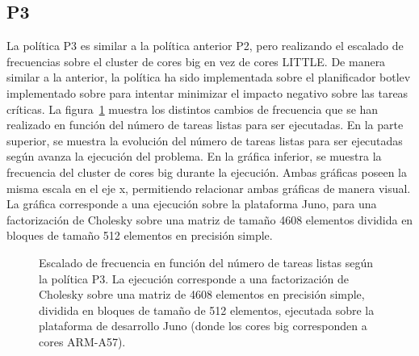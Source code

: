 \subsection{P3}
La política P3 es similar a la política anterior P2, pero realizando el
escalado de frecuencias sobre el cluster de cores big en vez de cores
LITTLE. De manera similar a la anterior, la política ha sido implementada
sobre el planificador botlev implementado sobre \ompss para intentar
minimizar el impacto negativo sobre las tareas críticas. La
figura~\ref{s5:fig:P3-evo} muestra los distintos cambios de frecuencia que
se han realizado en función del número de tareas listas para ser
ejecutadas. En la parte superior, se muestra la evolución del número de
tareas listas para ser ejecutadas según avanza la ejecución del
problema. En la gráfica inferior, se muestra la frecuencia del cluster de
cores big durante la ejecución. Ambas gráficas poseen la misma escala en el
eje x, permitiendo relacionar ambas gráficas de manera visual. La gráfica
corresponde a una ejecución sobre la plataforma Juno, para una
factorización de Cholesky sobre una matriz de tamaño 4608 elementos
dividida en bloques de tamaño 512 elementos en precisión simple.\\


\begin{figure}
  \centering
  {
    \setlength{\fboxsep}{-10pt}
  }
  \caption[Escalado de frecuencia en función del número de tareas listas
  según la política P3]{Escalado de frecuencia en función del número de
    tareas listas según la política P3. La ejecución corresponde a una
    factorización de Cholesky sobre una matriz de 4608 elementos en
    precisión simple, dividida en bloques de tamaño de 512 elementos,
    ejecutada sobre la plataforma de desarrollo Juno (donde los cores big
    corresponden a cores ARM-A57).}
  \label{s5:fig:P3-evo}
\end{figure}



